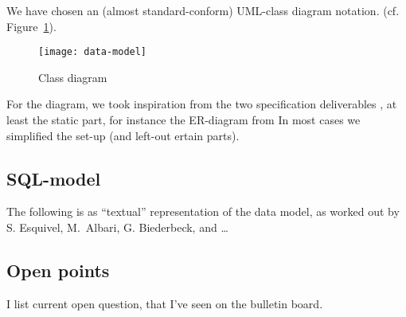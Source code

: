 We have chosen an (almost standard-conform) UML-class diagram notation.  (cf.
Figure~\ref{fig:classdiagram}).


\begin{figure}[htbp]
  \centering
  \texttt{[image: data-model]}
  \caption{Class diagram}
  \label{fig:classdiagram}
\end{figure}

For the diagram, we took inspiration from the two specification deliverables
\cite{coma:spec1} \cite{coma:spec2}, at least the static part, for instance
the ER-diagram from \cite{coma:spec1} In most cases we simplified the set-up
(and left-out ertain parts).








\subsection*{SQL-model}
\label{sec:datamodel.sql}
%

The following is as ``textual'' representation of the data model, as worked
out by S. Esquivel, M.\ Albari, G. Biederbeck, and \ldots






\newpage




\newpage







\newpage
\subsection*{Open points}

I list current open question, that I've seen on the bulletin board.

